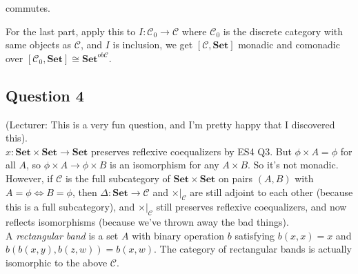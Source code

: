 \documentclass[a4paper]{article}
\begin{document}
commutes.

For the last part, apply this to $I:\mathcal{C}_0 \to \mathcal{C}$ where $\mathcal{C}_0$ is the discrete category with same objects as $\mathcal{C}$, and $I$ is inclusion, we get $[\mathcal{C},\mathbf{Set}]$ monadic and comonadic over $[\mathcal{C}_0,\mathbf{Set}] \cong \mathbf{Set}^{ob\mathcal{C}}$.

\subsection{Question 4}
(Lecturer: This is a very fun question, and I'm pretty happy that I discovered this).\\
$x:\mathbf{Set} \times \mathbf{Set} \to \mathbf{Set}$ preserves reflexive coequalizers by ES4 Q3. But $\phi\times A = \phi$ for all $A$, so $\phi \times A \to \phi \times B$ is an isomorphism for any $A \times B$. So it's not monadic.\\
However, if $\mathcal{C}$ is the full subcategory of $\mathbf{Set} \times \mathbf{Set}$ on pairs $(A,B)$ with $A=\phi \iff B=\phi$, then $\Delta: \mathbf{Set} \to \mathcal{C}$ and $\times|_\mathcal{C}$ are still adjoint to each other (because this is a full subcategory), and $\times|_\mathcal{C}$ still preserves reflexive coequalizers, and now reflects isomorphisms (because we've thrown away the bad things).\\
A \emph{rectangular band} is a set $A$ with binary operation $b$ satisfying $b(x,x) = x$ and $b(b(x,y),b(z,w)) = b(x,w)$. The category of rectangular bands is actually isomorphic to the above $\mathcal{C}$.
\end{document}
